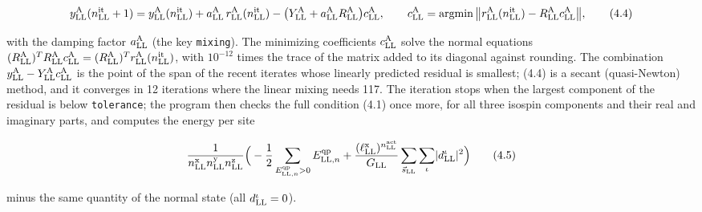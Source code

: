 \documentclass[
  10pt,
]{article}
\begin{document}
\[y^{\rm A}_{\rm LL}(n^{\rm it}_{\rm LL}+1)=y^{\rm A}_{\rm LL}(n^{\rm it}_{\rm LL})+a^{\rm A}_{\rm LL}\,r^{\rm A}_{\rm LL}(n^{\rm it}_{\rm LL})-\big(Y^{\rm A}_{\rm LL}+a^{\rm A}_{\rm LL}R^{\rm A}_{\rm LL}\big)c^{\rm A}_{\rm LL},\qquad c^{\rm A}_{\rm LL}=\mathrm{argmin}\,\big\lVert r^{\rm A}_{\rm LL}(n^{\rm it}_{\rm LL})-R^{\rm A}_{\rm LL}c^{\rm A}_{\rm LL}\big\rVert,\tag{4.4}\]

with the damping factor \(a^{\rm A}_{\rm LL}\) (the key
\texttt{mixing}). The minimizing coefficients \(c^{\rm A}_{\rm LL}\)
solve the normal equations
\((R^{\rm A}_{\rm LL})^TR^{\rm A}_{\rm LL}c^{\rm A}_{\rm LL}=(R^{\rm A}_{\rm LL})^Tr^{\rm A}_{\rm LL}(n^{\rm it}_{\rm LL})\),
with \(10^{-12}\) times the trace of the matrix added to its diagonal
against rounding. The combination
\(y^{\rm A}_{\rm LL}-Y^{\rm A}_{\rm LL}c^{\rm A}_{\rm LL}\) is the point
of the span of the recent iterates whose linearly predicted residual is
smallest; (4.4) is a secant (quasi-Newton) method, and it converges in
12 iterations where the linear mixing needs 117. The iteration stops
when the largest component of the residual is below \texttt{tolerance};
the program then checks the full condition (4.1) once more, for all
three isospin components and their real and imaginary parts, and
computes the energy per site

\[\frac1{n^{\rm x}_{\rm LL}n^{\rm y}_{\rm LL}n^{\rm z}_{\rm LL}}\Big(-\frac12\sum_{E^{\rm qp}_{{\rm LL},n}>0}E^{\rm qp}_{{\rm LL},n}+\frac{(\ell^{\rm x}_{\rm LL})^{n^{\rm act}_{\rm LL}}}{G_{\rm LL}}\sum_{\vec s_{\rm LL}}\sum_\iota\lvert d^\iota_{\rm LL}\rvert^2\Big)\tag{4.5}\]

minus the same quantity of the normal state (all
\(d^\iota_{\rm LL}=0\)).
\end{document}
